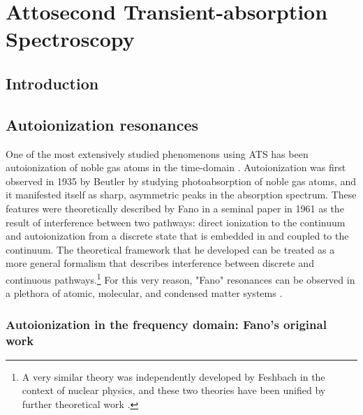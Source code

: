 \chapter{Attosecond Transient-absorption Spectroscopy}
\label{chap:ATS}

\section{Introduction}
\label{sec:intro_ats}


\section{Autoionization resonances}
\label{sec:fano_ar}

One of the most extensively studied phenomenons using ATS has been autoionization of noble gas atoms in the time-domain \cite{wangAttosecondTimeResolvedAutoionization2010, ottAttosecondMultidimensionalInterferometry2012, stoossRealTimeReconstructionStrongFieldDriven2018, kaldunExtractingPhaseAmplitude2014, kaldunObservingUltrafastBuildup2016}.  Autoionization was first observed in 1935 by Beutler \cite{beutlerUeberAbsorptionsserienArgon1935} by studying photoabsorption of noble gas atoms, and it manifested itself as sharp, asymmetric peaks in the absorption spectrum.  These features were theoretically described by Fano in a seminal paper in 1961 \cite{fanoSulloSpettroDi1935, fanoEffectsConfigurationInteraction1961} as the result of interference between two pathways: direct ionization to the continuum and autoionization from a discrete state that is embedded in and coupled to the continuum. The theoretical framework that he developed can be treated as a more general formalism that describes interference between discrete and continuous pathways.\footnote{A very similar theory was independently developed by Feshbach in the context of nuclear physics, and these two theories have been unified by further theoretical work \cite{feshbachUnifiedTheoryNuclear1958, feshbachUnifiedTheoryNuclear1962, bhatiaLineshapeParameters1P1984}
	.} For this very reason, "Fano" resonances can be observed in a plethora of atomic, molecular, and condensed matter systems \cite{miroshnichenkoFanoResonancesNanoscale2010}.

\subsection{Autoionization in the frequency domain: Fano's original work}
\label{sec:og_fano}

